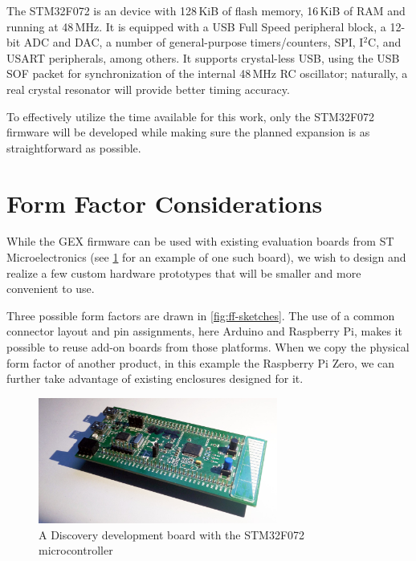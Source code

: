 The STM32F072 is an \armcm device with 128\,KiB of flash memory, 16\,KiB of \gls{RAM} and running at 48\,MHz. It is equipped with a \gls{USB} Full Speed peripheral block, a 12-bit \gls{ADC} and \gls{DAC}, a number of general-purpose timers/counters, SPI, I$^2$C, and USART peripherals, among others. It supports crystal-less \gls{USB}, using the USB SOF packet for synchronization of the internal 48\,MHz RC oscillator; naturally, a real crystal resonator will provide better timing accuracy.

To effectively utilize the time available for this work, only the STM32F072 firmware will be developed while making sure the planned expansion is as straightforward as possible.

\section{Form Factor Considerations} \label{sec:formfactors}

While the GEX firmware can be used with existing evaluation boards from ST Microelectronics (see \cref{fig:discovery} for an example of one such board), we wish to design and realize a few custom hardware prototypes that will be smaller and more convenient to use.

Three possible form factors are drawn in \cref{fig:ff-sketches}. The use of a common connector layout and pin assignments, here Arduino and Raspberry Pi, makes it possible to reuse add-on boards from those platforms. When we copy the physical form factor of another product, in this example the Raspberry Pi Zero, we can further take advantage of existing enclosures designed for it.

\begin{figure}[h]
	\centering
	\includegraphics[width=0.7\textwidth] {img/disco072.jpg}
	\caption[A Discovery board with STM32F072]{\label{fig:discovery}A Discovery development board with the STM32F072 microcontroller}
\end{figure}


